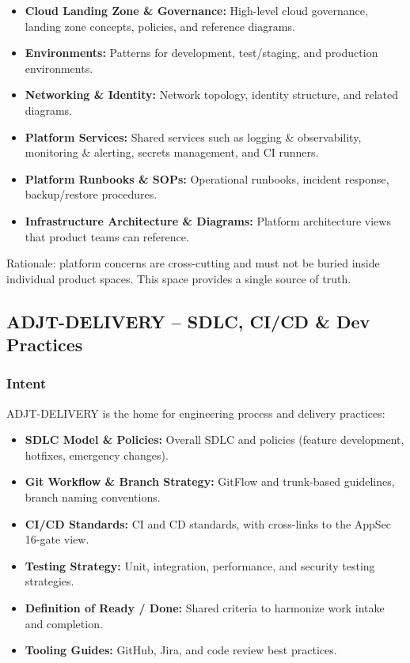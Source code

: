 \documentclass[11pt]{article}
\begin{document}
\begin{itemize}[leftmargin=*]
  \item \textbf{Cloud Landing Zone \& Governance:} High-level cloud
        governance, landing zone concepts, policies, and reference
        diagrams.
  \item \textbf{Environments:} Patterns for development, test/staging,
        and production environments.
  \item \textbf{Networking \& Identity:} Network topology, identity
        structure, and related diagrams.
  \item \textbf{Platform Services:} Shared services such as logging
        \& observability, monitoring \& alerting, secrets management,
        and CI runners.
  \item \textbf{Platform Runbooks \& SOPs:} Operational runbooks,
        incident response, backup/restore procedures.
  \item \textbf{Infrastructure Architecture \& Diagrams:} Platform
        architecture views that product teams can reference.
\end{itemize}

Rationale: platform concerns are cross-cutting and must not be buried
inside individual product spaces. This space provides a single source
of truth.

\subsection{ADJT-DELIVERY -- SDLC, CI/CD \& Dev Practices}

\subsubsection{Intent}

ADJT-DELIVERY is the home for engineering process and delivery
practices:

\begin{itemize}[leftmargin=*]
  \item \textbf{SDLC Model \& Policies:} Overall SDLC and policies
        (feature development, hotfixes, emergency changes).
  \item \textbf{Git Workflow \& Branch Strategy:} GitFlow and
        trunk-based guidelines, branch naming conventions.
  \item \textbf{CI/CD Standards:} CI and CD standards, with cross-links
        to the AppSec 16-gate view.
  \item \textbf{Testing Strategy:} Unit, integration, performance, and
        security testing strategies.
  \item \textbf{Definition of Ready / Done:} Shared criteria to
        harmonize work intake and completion.
  \item \textbf{Tooling Guides:} GitHub, Jira, and code review best
        practices.
\end{itemize}
\end{document}

